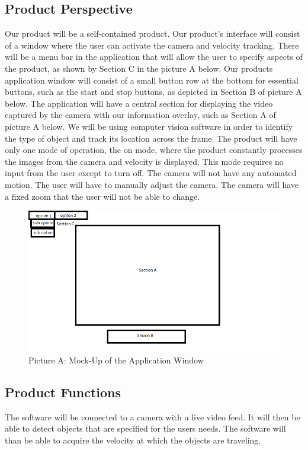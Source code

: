 \documentclass[letterpaper,10pt,onecolumn,draftclsnofoot]{IEEEtran}
\begin{document}
\subsection{Product Perspective}
Our product will be a self-contained product. 
Our product's interface will consist of a window where the user can activate the camera and velocity tracking.
There will be a menu bar in the application that will allow the user to specify aspects of the product, as shown by Section C in the picture A below.
Our products application window will consist of a small button row at the bottom for essential buttons, such as the start and stop buttons, as depicted in Section B of picture A below.
The application will have a central section for displaying the video captured by the camera with our information overlay, such as Section A of picture A below.
We will be using computer vision software in order to identify the type of object and track its location across the frame.
The product will have only one mode of operation, the on mode, where the product constantly processes the images from the camera and velocity is displayed.
This mode requires no input from the user except to turn off.
The camera will not have any automated motion.
The user will have to manually adjust the camera.
The camera will have a fixed zoom that the user will not be able to change.

\begin{figure}[h]
    \centering
    \includegraphics[scale=0.75]{cs_461_mock_up}
    \caption{Picture A: Mock-Up of the Application Window}
    \label{fig: pic_a}
\end{figure}


\subsection{Product Functions}
The software will be connected to a camera with a live video feed.
It will then be able to detect objects that are specified for the users needs.
The software will than be able to acquire the velocity at which the objects are traveling.
\end{document}
